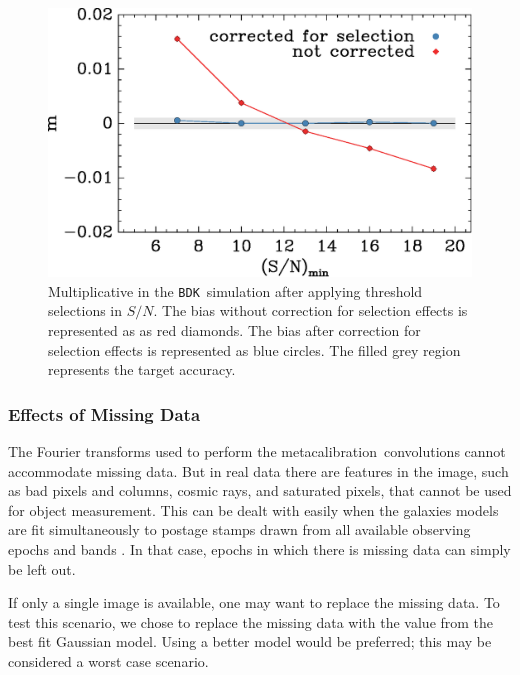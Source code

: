 \documentclass[iop]{emulateapj}
\newcommand{\snr}{$S/N$}
\newcommand{\mcal}{metacalibration}
\newcommand{\bdsim}{\texttt{BDK}}
\begin{document}
\begin{figure}
    \centering
    \includegraphics[width=\columnwidth]{mc-select-bias-thresh-with-nocorr.eps}

    \caption{Multiplicative in the \bdsim\ simulation after applying
        threshold selections in \snr.  The bias without correction for
        selection effects is represented as as red diamonds. The bias after
        correction for selection effects is represented as blue circles.  
        The filled grey region represents the target accuracy. } 

\label{fig:s2nthresh_nocorr}
\end{figure}



\subsubsection{Effects of Missing Data}

The Fourier transforms used to perform the \mcal\ convolutions cannot
accommodate missing data.  But in real data there are features in the image,
such as bad pixels and columns, cosmic rays, and saturated pixels, that cannot
be used for object measurement.  This can be dealt with easily when the
galaxies models are fit simultaneously to postage stamps drawn from all
available observing epochs and bands \citep[e.g.][]{Jarvis2016}.  In that case,
epochs in which there is missing data can simply be left out.

If only a single image is available, one may want to replace the missing data.
To test this scenario, we chose to replace the missing data with the value from
the best fit Gaussian model.  Using a better model would be preferred; this may
be considered a worst case scenario.
\end{document}
